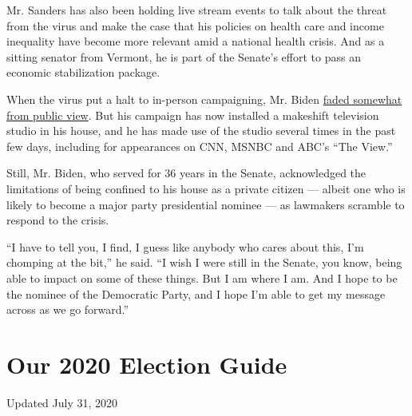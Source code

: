 Mr. Sanders has also been holding live stream events to talk about the
threat from the virus and make the case that his policies on health care
and income inequality have become more relevant amid a national health
crisis. And as a sitting senator from Vermont, he is part of the
Senate's effort to pass an economic stabilization package.

When the virus put a halt to in-person campaigning, Mr. Biden
\href{https://www.nytimes.com/2020/03/23/us/politics/joe-biden-2020-virus.html}{faded
somewhat from public view}. But his campaign has now installed a
makeshift television studio in his house, and he has made use of the
studio several times in the past few days, including for appearances on
CNN, MSNBC and ABC's ``The View.''

Still, Mr. Biden, who served for 36 years in the Senate, acknowledged
the limitations of being confined to his house as a private citizen ---
albeit one who is likely to become a major party presidential nominee
--- as lawmakers scramble to respond to the crisis.

``I have to tell you, I find, I guess like anybody who cares about this,
I'm chomping at the bit,'' he said. ``I wish I were still in the Senate,
you know, being able to impact on some of these things. But I am where I
am. And I hope to be the nominee of the Democratic Party, and I hope I'm
able to get my message across as we go forward.''

\hypertarget{our-2020-election-guide}{%
\section{Our 2020 Election Guide}\label{our-2020-election-guide}}

Updated July 31, 2020

